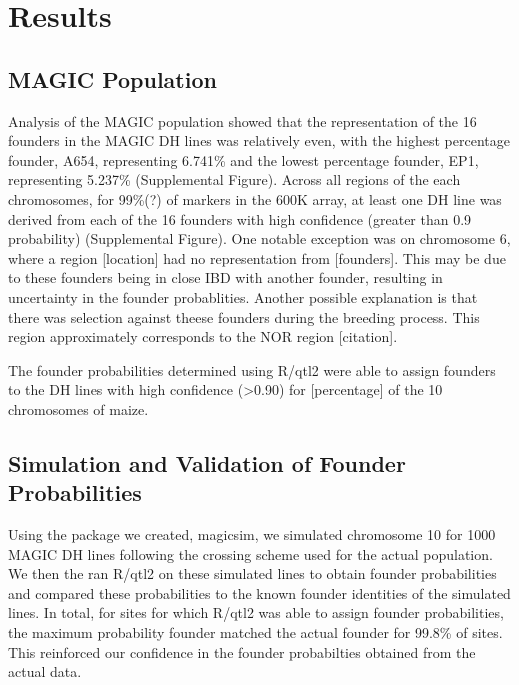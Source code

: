 \documentclass[article,9pt,twocolumn,twoside]{rilabRxiv}
\begin{document}



\section{Results}

\subsection{MAGIC Population}
Analysis of the MAGIC population showed that the representation of the 16 founders in the MAGIC DH lines was relatively even, with the highest percentage founder, A654, representing 6.741\% and the lowest percentage founder, EP1, representing 5.237\% (Supplemental Figure). Across all regions of the each chromosomes, for 99\%(?) of markers in the 600K array, at least one DH line was derived from each of the 16 founders with high confidence (greater than 0.9 probability) (Supplemental Figure). One notable exception was on chromosome 6, where a region [location] had no representation from [founders]. This may be due to these founders being in close IBD with another founder, resulting in uncertainty in the founder probablities. Another possible explanation is that there was selection against theese founders during the breeding process. This region approximately corresponds to the NOR region [citation].


The founder probabilities determined using R/qtl2 were able to assign founders to the DH lines with high confidence (>0.90) for [percentage] of the 10 chromosomes of maize.

\subsection{Simulation and Validation of Founder Probabilities}
Using the package we created, magicsim, we simulated chromosome 10 for 1000 MAGIC DH lines following the crossing scheme used for the actual population. We then the ran R/qtl2 on these simulated lines to obtain founder probabilities and compared these probabilities to the known founder identities of the simulated lines. In total, for sites for which R/qtl2 was able to assign founder probabilities, the maximum probability founder matched the actual founder for 99.8\% of sites. This reinforced our confidence in the founder probabilties obtained from the actual data.
\end{document}
